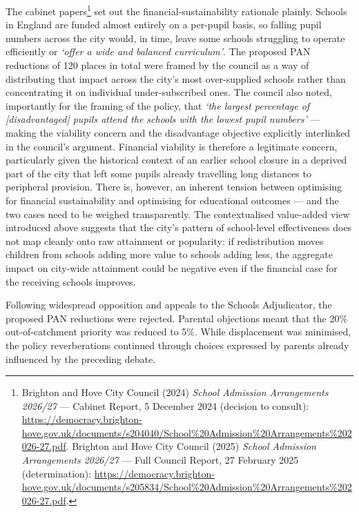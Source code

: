 \documentclass[
  12pt,
  titlepage]{article}
\begin{document}
The cabinet papers\footnote{Brighton and Hove City Council (2024)
  \emph{School Admission Arrangements 2026/27} --- Cabinet Report, 5
  December 2024 (decision to consult):
  \url{https://democracy.brighton-hove.gov.uk/documents/s204040/School\%20Admission\%20Arrangements\%202026-27.pdf}.
  Brighton and Hove City Council (2025) \emph{School Admission
  Arrangements 2026/27} --- Full Council Report, 27 February 2025
  (determination):
  \url{https://democracy.brighton-hove.gov.uk/documents/s205834/School\%20Admission\%20Arrangements\%202026-27.pdf}.}
set out the financial-sustainability rationale plainly. Schools in
England are funded almost entirely on a per-pupil basis, so falling
pupil numbers across the city would, in time, leave some schools
struggling to operate efficiently or \emph{`offer a wide and balanced
curriculum'}. The proposed PAN reductions of 120 places in total were
framed by the council as a way of distributing that impact across the
city's most over-supplied schools rather than concentrating it on
individual under-subscribed ones. The council also noted, importantly
for the framing of the policy, that \emph{`the largest percentage of
{[}disadvantaged{]} pupils attend the schools with the lowest pupil
numbers'} --- making the viability concern and the disadvantage
objective explicitly interlinked in the council's argument. Financial
viability is therefore a legitimate concern, particularly given the
historical context of an earlier school closure in a deprived part of
the city that left some pupils already travelling long distances to
peripheral provision. There is, however, an inherent tension between
optimising for financial sustainability and optimising for educational
outcomes --- and the two cases need to be weighed transparently. The
contextualised value-added view introduced above suggests that the
city's pattern of school-level effectiveness does not map cleanly onto
raw attainment or popularity: if redistribution moves children from
schools adding more value to schools adding less, the aggregate impact
on city-wide attainment could be negative even if the financial case for
the receiving schools improves.

Following widespread opposition and appeals to the Schools Adjudicator,
the proposed PAN reductions were rejected. Parental objections meant
that the 20\% out-of-catchment priority was reduced to 5\%. While
displacement was minimised, the policy reverberations continued through
choices expressed by parents already influenced by the preceding debate.
\end{document}
